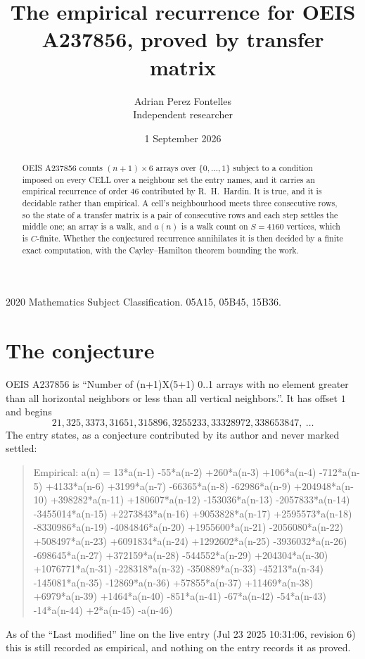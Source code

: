 \documentclass[11pt,a4paper]{article}
\title{The empirical recurrence for OEIS A237856, proved by transfer matrix}
\author{Adrian Perez Fontelles\\ \small Independent researcher}
\date{1 September 2026}
\theoremstyle{plain}
\theoremstyle{definition}
\begin{document}
\maketitle

\begin{abstract}
OEIS A237856 counts $(n+1)\times6$ arrays over $\{0,\dots,1\}$ subject to a condition imposed on
every CELL over a neighbour set the entry names, and it carries an empirical recurrence of
order $46$ contributed by R.~H.~Hardin. It is true, and it is decidable rather than
empirical. A cell's neighbourhood meets three consecutive rows, so the state of a transfer
matrix is a pair of consecutive rows and each step settles the middle one; an array is a
walk, and $a(n)$ is a walk count on $S=4160$ vertices, which is $C$-finite. Whether the
conjectured recurrence annihilates it is then decided by a finite exact computation, with the
Cayley--Hamilton theorem bounding the work.
\end{abstract}

\noindent\small 2020 Mathematics Subject Classification. 05A15, 05B45, 15B36.\normalsize

\section{The conjecture}

OEIS A237856 is ``Number of (n+1)X(5+1) 0..1 arrays with no element greater than all horizontal neighbors or less than all vertical neighbors.''. It has offset $1$ and begins
\[
21, 325, 3373, 31651, 315896, 3255233, 33328972, 338653847,\ \dots
\]
The entry states, as a conjecture contributed by its author and never marked settled:
\begin{quote}
Empirical: a(n) = 13*a(n-1) -55*a(n-2) +260*a(n-3) +106*a(n-4) -712*a(n-5) +4133*a(n-6) +3199*a(n-7) -66365*a(n-8) -62986*a(n-9) +204948*a(n-10) +398282*a(n-11) +180607*a(n-12) -153036*a(n-13) -2057833*a(n-14) -3455014*a(n-15) +2273843*a(n-16) +9053828*a(n-17) +2595573*a(n-18) -8330986*a(n-19) -4084846*a(n-20) +1955600*a(n-21) -2056080*a(n-22) +508497*a(n-23) +6091834*a(n-24) +1292602*a(n-25) -3936032*a(n-26) -698645*a(n-27) +372159*a(n-28) -544552*a(n-29) +204304*a(n-30) +1076771*a(n-31) -228318*a(n-32) -350889*a(n-33) -45213*a(n-34) -145081*a(n-35) -12869*a(n-36) +57855*a(n-37) +11469*a(n-38) +6979*a(n-39) +1464*a(n-40) -851*a(n-41) -67*a(n-42) -54*a(n-43) -14*a(n-44) +2*a(n-45) -a(n-46)
\end{quote}
As of the ``Last modified'' line on the live entry (Jul 23 2025 10:31:06, revision 6) this is still
recorded as empirical, and nothing on the entry records it as proved.
\end{document}
